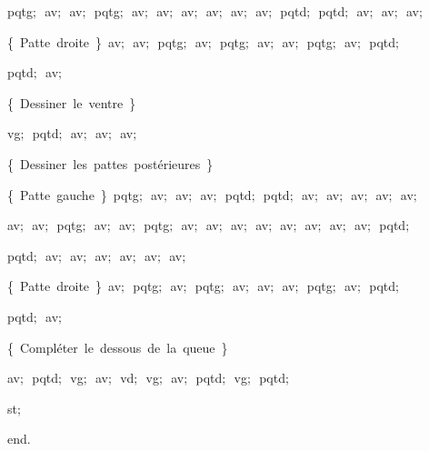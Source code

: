 {\vspace{\neglskip}\mbox{\blc  \blk\blk\idt  pqtg$;$\ av$;$\ av$;$\ pqtg$;$\ av$;$\ av$;$\ av$;$\ av$;$\ av$;$\ av$;$\ pqtd$;$\ pqtd$;$\ av$;$\ av$;$\ av$;$}\par 
\vspace{\neglskip}\mbox{\blc  \blk\blk\idt  \cmt  \{\ Patte\ droite\ \}\idt \ av$;$\ av$;$\ pqtg$;$\ av$;$\ pqtg$;$\ av$;$\ av$;$\ pqtg$;$\ av$;$\ pqtd$;$\ }\par 
\vspace{\neglskip}\mbox{\blc  \blk\blk\idt  pqtd$;$\ av$;$\ }\par 
\vspace{\neglskip}\mbox{\blc  \blk\idt  \cmt  \{\ Dessiner\ le\ ventre\ \}\idt }\par 
\vspace{\neglskip}\mbox{\blc  \blk\blk\idt  vg$;$\ pqtd$;$\ av$;$\ av$;$\ av$;$\ }\par 
\vspace{\neglskip}\mbox{\blc  \blk\idt  \cmt  \{\ Dessiner\ les\ pattes\ postérieures\ \}\idt }\par 
\vspace{\neglskip}\mbox{\blc  \blk\blk\idt  \cmt  \{\ Patte\ gauche\ \}\idt \ pqtg$;$\ av$;$\ av$;$\ av$;$\ pqtd$;$\ pqtd$;$\ av$;$\ av$;$\ av$;$\ av$;$\ av$;$\ }\par 
\vspace{\neglskip}\mbox{\blc  \blk\blk\idt  av$;$\ av$;$\ pqtg$;$\ av$;$\ av$;$\ pqtg$;$\ av$;$\ av$;$\ av$;$\ av$;$\ av$;$\ av$;$\ av$;$\ av$;$\ pqtd$;$\ }\par 
\vspace{\neglskip}\mbox{\blc  \blk\blk\idt  pqtd$;$\ av$;$\ av$;$\ av$;$\ av$;$\ av$;$\ av$;$\ }\par 
\vspace{\neglskip}\mbox{\blc  \blk\blk\idt  \cmt  \{\ Patte\ droite\ \}\idt \ av$;$\ pqtg$;$\ av$;$\ pqtg$;$\ av$;$\ av$;$\ av$;$\ pqtg$;$\ av$;$\ pqtd$;$\ }\par 
\vspace{\neglskip}\mbox{\blc  \blk\blk\idt  pqtd$;$\ av$;$\ }\par 
\vspace{\neglskip}\mbox{\blc  \blk\idt  \cmt  \{\ Compléter\ le\ dessous\ de\ la\ queue\ \}\idt }\par 
\vspace{\neglskip}\mbox{\blc  \blk\idt  av$;$\ pqtd$;$\ vg$;$\ av$;$\ vd$;$\ vg$;$\ av$;$\ pqtd$;$\ vg$;$\ pqtd$;$}\par 
\vspace{\neglskip}\mbox{\blc  \blk\idt  st$;$}\par 
\vspace{\neglskip}\mbox{\blc  \idt  \mcl end\idt $.$}\par 

\medskip }

